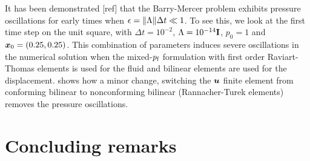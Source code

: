 It has been demonstrated [ref] that the Barry-Mercer problem exhibits pressure
oscillations for early times when $\epsilon=\lVert\Lambda\rVert \Delta t \ll 1$.
To see this, we look at the first time step on the unit square, with $\Delta
t=10^{-2}$, $\Lambda=10^{-14}\mathrm{\bf I}$, $p_0=1$ and $\boldsymbol{x}_0=(0.25,0.25)$.
This combination of parameters induces severe oscillations in the numerical
solution when the mixed-$p_{\text{f}}$ formulation with first order Raviart-Thomas
elements is used for the fluid and bilinear elements are used for the displacement.
 shows
how a minor change, switching the $\boldsymbol{u}$ finite element from conforming bilinear
to nonconforming bilinear (Rannacher-Turek elements) removes the pressure
oscillations.


\section{Concluding remarks}



\acks









